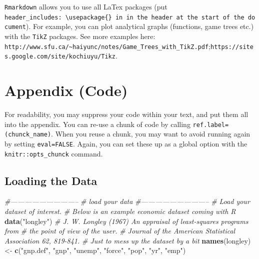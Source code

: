 \documentclass[11pt,]{article}
\newenvironment{Shaded}{\begin{snugshade}}{\end{snugshade}}
\newcommand{\KeywordTok}[1]{\textcolor[rgb]{0.13,0.29,0.53}{\textbf{#1}}}
\newcommand{\DataTypeTok}[1]{\textcolor[rgb]{0.13,0.29,0.53}{#1}}
\newcommand{\StringTok}[1]{\textcolor[rgb]{0.31,0.60,0.02}{#1}}
\newcommand{\CommentTok}[1]{\textcolor[rgb]{0.56,0.35,0.01}{\textit{#1}}}
\newcommand{\OtherTok}[1]{\textcolor[rgb]{0.56,0.35,0.01}{#1}}
\newcommand{\OperatorTok}[1]{\textcolor[rgb]{0.81,0.36,0.00}{\textbf{#1}}}
\newcommand{\NormalTok}[1]{#1}
\begin{document}
\texttt{Rmarkdown} allows you to use all LaTex packages (put
\texttt{header\_includes:\ \textbackslash{}usepackage\{\}\ in\ in\ the\ header\ at\ the\ start\ of\ the\ document}).
For example, you can plot analytical graphs (functions, game trees etc.)
with the \texttt{TikZ} packages. See more examples here:\newline
\texttt{http://www.sfu.ca/\textasciitilde{}haiyunc/notes/Game\_Trees\_with\_TikZ.pdf};\newline \texttt{https://sites.google.com/site/kochiuyu/Tikz}.

\section{Appendix (Code)}\label{appendix-code}

For readability, you may suppress your code within your text, and put
them all into the appendix. You can re-use a chunk of code by calling
\texttt{ref.label=(chunck\_name)}. When you reuse a chunk, you may want
to avoid running again by setting \texttt{eval=FALSE}. Again, you can
set these up as a global option with the \texttt{knitr::opts\_chunck}
command.

\tiny

\begin{Shaded}
\end{Shaded}

\normalsize

\subsection{Loading the Data}\label{loading-the-data}

\tiny

\begin{Shaded}
\begin{Highlighting}[]
\CommentTok{#-----------------------------}
\CommentTok{# load your data}
\CommentTok{#-----------------------------}
  \CommentTok{# Load your dataset of interest. }
  \CommentTok{# Below is an example economic dataset coming with R}
    \KeywordTok{data}\NormalTok{(}\StringTok{"longley"}\NormalTok{)}
      \CommentTok{# J. W. Longley (1967) An appraisal of least-squares programs from }
      \CommentTok{# the point of view of the user. }
      \CommentTok{# Journal of the American Statistical Association 62, 819-841.}
  \CommentTok{# Just to mess up the dataset by a bit}
    \KeywordTok{names}\NormalTok{(longley) <-}\StringTok{ }\KeywordTok{c}\NormalTok{(}\StringTok{"gnp.def"}\NormalTok{, }\StringTok{"gnp"}\NormalTok{, }\StringTok{"unemp"}\NormalTok{, }\StringTok{"force"}\NormalTok{, }\StringTok{"pop"}\NormalTok{, }\StringTok{"yr"}\NormalTok{, }\StringTok{"emp"}\NormalTok{)}
\end{Highlighting}
\end{Shaded}
\end{document}
